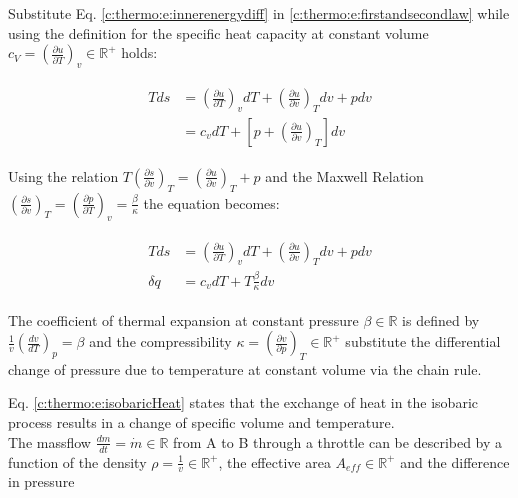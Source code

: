 Substitute Eq. \ref{c:thermo:e:innerenergydiff} in \ref{c:thermo:e:firstandsecondlaw} while using the definition for the specific heat capacity at constant volume $c_V = \left(\frac{\partial u}{\partial T}\right)_v \in \mathbb{R}^+$ holds:

\begin{align*}
\begin{split}
T ds &= \left( \frac{\partial u}{\partial T} \right)_v dT  + \left( \frac{\partial u}{ \partial v} \right)_T dv + p dv \\
&= c_v dT + \left[ p + \left( \frac{\partial u}{\partial v}\right)_T\right] dv
\end{split}
\end{align*}

Using the relation \cite[p.375]{Struchtrup2014} $T\left( \frac{\partial s}{\partial v}\right)_T = \left( \frac{\partial u}{\partial v}\right)_T + p $ and the Maxwell Relation $\left( \frac{\partial s}{\partial v}\right)_T = \left( \frac{\partial p}{\partial T}\right)_v = \frac{\beta}{\kappa} $ the equation becomes:

\begin{align}
\begin{split}
T ds &= \left( \frac{\partial u}{\partial T} \right)_v dT  + \left( \frac{\partial u}{ \partial v} \right)_T dv + p dv \\
\delta q &= c_v dT + T \frac{\beta}{\kappa} dv
\end{split}
\label{c:thermo:e:isobaricHeat}
\end{align}

The coefficient of thermal expansion at constant pressure $\beta \in \mathbb{R}$ is defined by $\frac{1}{v}\left( \frac{dv}{dT} \right)_p = \beta$ and the compressibility $\kappa = \left( \frac{\partial v}{\partial p} \right)_T \in \mathbb{R}^+$ substitute the differential change of pressure due to temperature at constant volume via the chain rule.\newline

Eq. \ref{c:thermo:e:isobaricHeat} states that the exchange of heat in the isobaric process results in a change of specific volume and temperature. \\

The massflow $\frac{dm}{dt} = \dot{m} \in \mathbb{R}$ from A to B through a throttle can be described by a function of the density $\rho = \frac{1}{v} \in \mathbb{R}^+$, the effective area $A_{eff} \in \mathbb{R}^+$ and the difference in pressure 

